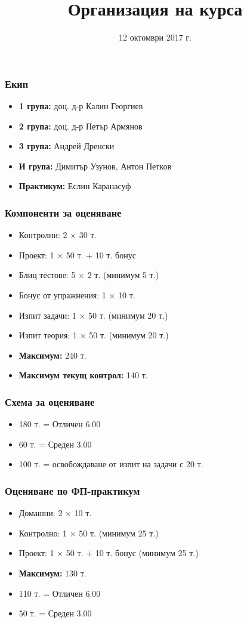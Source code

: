 \documentclass{beamer}
\title{Организация на курса}
\date{12 октомври 2017 г.}
\begin{document}
\begin{frame}
  \titlepage
\end{frame}

\begin{frame}
  \frametitle{Екип}

  \begin{itemize}
  \item \textbf{1 група:} доц. д-р Калин Георгиев
  \item \textbf{2 група:} доц. д-р Петър Армянов
  \item \textbf{3 група:} Андрей Дренски
  \item \textbf{И група:} Димитър Узунов, Антон Петков 
  \item \textbf{Практикум:} Еслин Каранасуф
  \end{itemize}
\end{frame}

\begin{frame}
  \frametitle{Компоненти за оценяване}

  \begin{itemize}
  \item Контролни: 2 $\times$ 30 т.
  \item Проект: 1 $\times$ 50 т. + 10 т. бонус
  \item Блиц тестове: 5 $\times$ 2 т. \alert{(минимум 5 т.)}
  \item Бонус от упражнения: 1 $\times$ 10 т.
  \item Изпит задачи: 1 $\times$ 50 т. \alert{(минимум 20 т.)}
  \item Изпит теория: 1 $\times$ 50 т. \alert{(минимум 20 т.)}
  \item \textbf{Максимум:} 240 т.
  \item \textbf{Максимум текущ контрол:} 140 т.
  \end{itemize}
\end{frame}

\begin{frame}
  \frametitle{Схема за оценяване}

  \begin{itemize}
  \item 180 т. = Отличен 6.00
  \item 60 т. = Среден 3.00
  \item 100 т. = освобождаване от изпит на задачи с 20 т.
  \end{itemize}
\end{frame}

\begin{frame}
  \frametitle{Оценяване по ФП-практикум}

  \begin{itemize}
  \item Домашни: 2 $\times$ 10 т.
  \item Контролно: 1 $\times$ 50 т. \alert{(минимум 25 т.)}
  \item Проект: 1 $\times$ 50 т. + 10 т. бонус \alert{(минимум 25 т.)}
  \item \textbf{Максимум:} 130 т.
  \item 110 т. = Отличен 6.00
  \item 50 т. = Среден 3.00
  \end{itemize}
\end{frame}
\end{document}
